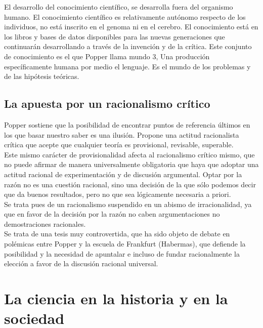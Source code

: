 \documentclass[a4paper, 11pt, twocolumn, spanish]{article}
\begin{document}
El desarrollo del conocimiento científico, se desarrolla fuera del
organismo humano. El conocimiento científico es relativamente autónomo
respecto de los individuos, no está inscrito en el genoma ni en el
cerebro. El conocimiento está en los libros y bases de datos
disponibles para las nuevas generaciones que continuarán desarrollando
a través de la invención y de la crítica. Este conjunto de
conocimiento es el que Popper llama mundo 3, Una producción
específicamente humana por medio el lenguaje. Es el mundo de los
problemas y de las hipótesis teóricas.

\subsection{La apuesta por un racionalismo crítico}
\label{sec:org773c968}
Popper sostiene que la posibilidad de encontrar puntos de referencia
últimos en los que basar nuestro saber es una ilusión. Propone una
actitud racionalista crítica que acepte que cualquier teoría es
provisional, revisable, superable.\\[0pt]

Este mismo carácter de provisionalidad afecta al racionalismo crítico
mismo, que no puede afirmar de manera universalmente obligatoria que
haya que adoptar una actitud racional de experimentación y de
discusión argumental. Optar por la razón no es una cuestión racional,
sino una decisión de la que sólo podemos decir que da buenos
resultados, pero no que sea lógicamente necesaria a priori.\\[0pt]
Se trata pues de un racionalismo suspendido en un abismo de
irracionalidad, ya que en favor de la decisión por la razón no caben
argumentaciones no demostraciones racionales.\\[0pt]

Se trata de una tesis muy controvertida, que ha sido objeto de debate
en polémicas entre Popper y la escuela de Frankfurt (Habermas), que
defiende la posibilidad y la necesidad de apuntalar e incluso de
fundar racionalmente la elección a favor de la discusión racional
universal.



\section{La ciencia en la historia y en la sociedad}
\label{sec:orge42e81c}
\end{document}

